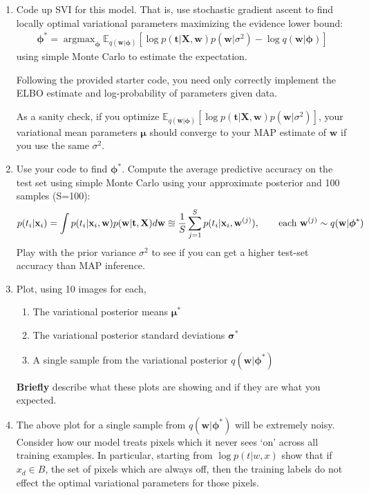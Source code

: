 \documentclass{harvardml}
\newcommand{\E}{\mathbb{E}}
\newcommand{\bx}{\mathbf{x}}
\newcommand{\bt}{\mathbf{t}}
\newcommand{\bw}{\mathbf{w}}
\newcommand{\bX}{\mathbf{X}}
\newcommand{\bmu}{\boldsymbol{\mu}}
\newcommand{\bsigma}{\boldsymbol{\sigma}}
\newcommand{\bphi}{\boldsymbol{\phi}}
\theoremstyle{plain}
\begin{document}
\begin{problem}
\begin{enumerate}[label=(\alph*)]
\item Code up SVI for this model.
That is, use stochastic gradient ascent to find locally optimal variational parameters maximizing the evidence lower bound:
\begin{align}
\bphi^* = \operatorname{argmax}_{\bphi} \E_{q(\bw|\bphi)} \left[ \log p(\bt | \bX, \bw) p(\bw | \sigma^2) - \log q(\bw | \bphi) \right]
\end{align}
using simple Monte Carlo to estimate the expectation.

Following the provided starter code, you need only correctly implement the ELBO estimate and log-probability of parameters given data.

As a sanity check, if you optimize $\E_{q(\bw|\bphi)} \left[\log p(\bt | \bX, \bw) p(\bw | \sigma^2) \right]$, your variational mean parameters $\bmu$ should converge to your MAP estimate of $\bw$ if you use the same $\sigma^2$.%

\item Use your code to find $\bphi^*$.
Compute the average predictive accuracy on the test set using simple Monte Carlo using your approximate posterior and 100 samples (S=100):
\begin{align}
p(t_i | \bx_i)  = \int p(t_i | \bx_i, \bw) p(\bw | \bt, \bX) d\bw
            \approxeq \frac{1}{S} \sum_{j=1}^S p(t_i | \bx_i, \bw^{(j)}), \qquad \textnormal{each } \bw^{(j)} \sim q(\bw | \bphi^*)
\end{align}
Play with the prior variance $\sigma^2$ to see if you can get a higher test-set accuracy than MAP inference.
\item Plot, using 10 images for each,
\begin{enumerate}[label=\roman*)]
  \item The variational posterior means $\bmu^*$
  \item The variational posterior standard deviations $\bsigma^*$
  \item A single sample from the variational posterior $q(\bw | \bphi^*)$
\end{enumerate}
\textbf{Briefly} describe what these plots are showing and if they are what you expected.

\item The above plot for a single sample from $q(\bw | \bphi^*)$ will be extremely noisy.
Consider how our model treats pixels which it never sees `on' across all training examples.
In particular, starting from $\log p(t|w,x)$ show that if $x_d \in B$, the set of pixels which are always off, then the training labels do not effect the optimal variational parameters for those pixels.


\end{enumerate}
\end{problem}
\end{document}
